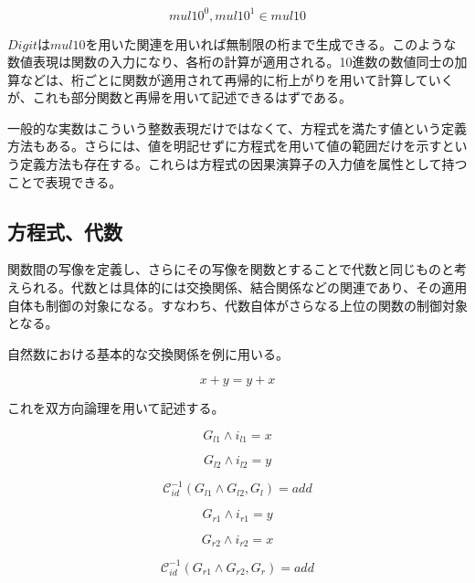 \documentclass[12pt]{article}
\begin{document}
\begin{equation} mul10^0 ,mul10^1 \in mul10\end{equation}

\(Digit\)は\(mul10\)を用いた関連を用いれば無制限の桁まで生成できる。このような数値表現は関数の入力になり、各桁の計算が適用される。10進数の数値同士の加算などは、桁ごとに関数が適用されて再帰的に桁上がりを用いて計算していくが、これも部分関数と再帰を用いて記述できるはずである。

一般的な実数はこういう整数表現だけではなくて、方程式を満たす値という定義方法もある。さらには、値を明記せずに方程式を用いて値の範囲だけを示すという定義方法も存在する。これらは方程式の因果演算子の入力値を属性として持つことで表現できる。

\subsection{方程式、代数}\label{ux65b9ux7a0bux5f0fux4ee3ux6570}

関数間の写像を定義し、さらにその写像を関数とすることで代数と同じものと考えられる。代数とは具体的には交換関係、結合関係などの関連であり、その適用自体も制御の対象になる。すなわち、代数自体がさらなる上位の関数の制御対象となる。

自然数における基本的な交換関係を例に用いる。

\begin{equation} x+y = y+x\end{equation}

これを双方向論理を用いて記述する。

\begin{equation} G_{l1} \wedge i_{l1} = x\end{equation}

\begin{equation} G_{l2} \wedge i_{l2}=y\end{equation}

\begin{equation} \mathcal{C}_{id}^{-1}(G_{l1} \wedge G_{l2},G_{l} )=add\end{equation}

\begin{equation} G_{r1} \wedge i_{r1} = y\end{equation}

\begin{equation} G_{r2} \wedge i_{r2}=x\end{equation}

\begin{equation} \mathcal{C}_{id}^{-1}(G_{r1} \wedge G_{r2} ,G_{r}) =add\end{equation}
\end{document}
